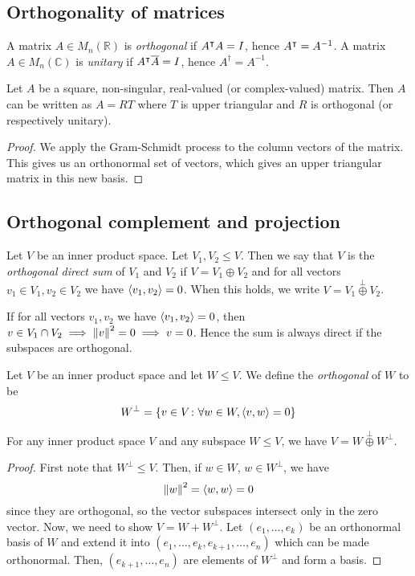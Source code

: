\subsection{Orthogonality of matrices}
\begin{definition}
	A matrix \( A \in M_n(\mathbb R) \) is \textit{orthogonal} if \( A^\intercal A = I \), hence \( A^\intercal = A^{-1} \).
	A matrix \( A \in M_n(\mathbb C) \) is \textit{unitary} if \( A^\intercal \overline A = I \), hence \( A^\dagger = A^{-1} \).
\end{definition}
\begin{proposition}
	Let \( A \) be a square, non-singular, real-valued (or complex-valued) matrix.
	Then \( A \) can be written as \( A = RT \) where \( T \) is upper triangular and \( R \) is orthogonal (or respectively unitary).
\end{proposition}
\begin{proof}
	We apply the Gram-Schmidt process to the column vectors of the matrix.
	This gives us an orthonormal set of vectors, which gives an upper triangular matrix in this new basis.
\end{proof}

\subsection{Orthogonal complement and projection}
\begin{definition}
	Let \( V \) be an inner product space.
	Let \( V_1, V_2 \leq V \).
	Then we say that \( V \) is the \textit{orthogonal direct sum} of \( V_1 \) and \( V_2 \) if \( V = V_1 \oplus V_2 \) and for all vectors \( v_1\in V_1, v_2\in V_2 \) we have \( \left\langle{v_1, v_2}\right\rangle = 0 \).
	When this holds, we write \( V = V_1 \overset{\perp}{\oplus} V_2 \).
\end{definition}
\begin{remark}
	If for all vectors \( v_1, v_2 \) we have \( \left\langle{v_1, v_2}\right\rangle = 0 \), then \( v \in V_1 \cap V_2 \implies \norm{v}^2 = 0 \implies v = 0 \).
	Hence the sum is always direct if the subspaces are orthogonal.
\end{remark}
\begin{definition}
	Let \( V \) be an inner product space and let \( W \leq V \).
	We define the \textit{orthogonal} of \( W \) to be
	\[
		W^\perp = \qty{v \in V \colon \forall w \in W, \left\langle{v,w}\right\rangle = 0}
	\]
\end{definition}
\begin{lemma}
	For any inner product space \( V \) and any subspace \( W \leq V \), we have \( V = W \overset{\perp}{\oplus} W^\perp \).
\end{lemma}
\begin{proof}
	First note that \( W^\perp \leq V \).
	Then, if \( w \in W \), \( w \in W^\perp \), we have
	\[
		\norm{w}^2 = \left\langle{w, w}\right\rangle = 0
	\]
	since they are orthogonal, so the vector subspaces intersect only in the zero vector.
	Now, we need to show \( V = W + W^\perp \).
	Let \( (e_1, \dots, e_k) \) be an orthonormal basis of \( W \) and extend it into \( (e_1, \dots, e_k, e_{k+1}, \dots, e_n) \) which can be made orthonormal.
	Then, \( (e_{k+1}, \dots, e_n) \) are elements of \( W^\perp \) and form a basis.
\end{proof}
